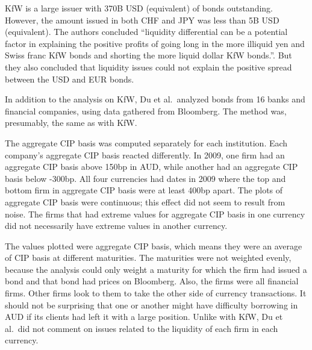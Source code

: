 

KfW is a large issuer with 370B USD (equivalent) of bonds outstanding.  However, the amount issued in both CHF and JPY was less than 5B USD (equivalent).  The authors concluded ``liquidity differential can be a potential factor in explaining the positive profits of going long in the more illiquid yen and Swiss franc KfW bonds and shorting the more liquid dollar KfW bonds.''.  But they also concluded that liquidity issues could not explain the positive spread between the USD and EUR bonds.  


In addition to the analysis on KfW, Du et al.\ analyzed bonds from 16 banks and financial companies, using data gathered from Bloomberg.  The method was, presumably, the same as with KfW.  

The aggregate CIP basis was computed separately for each institution.  Each company's aggregate CIP basis reacted differently.  In 2009, one firm had an aggregate CIP basis above 150bp in AUD, while another had an aggregate CIP basis below -300bp.   All four currencies had dates in 2009 where the top and bottom firm in aggregate CIP basis were at least 400bp apart.  The plots of aggregate CIP basis were continuous; this effect did not seem to result from noise.  The firms that had extreme values for aggregate CIP basis in one currency did not necessarily have extreme values in another currency.  

The values plotted were aggregate CIP basis, which means they were an average of CIP basis at different maturities.  The maturities were not weighted evenly, because the analysis could only weight a maturity for which the firm had issued a bond and that bond had prices on Bloomberg. Also, the firms were all financial firms.  Other firms look to them to take the other side of currency transactions.  It should not be surprising that one or another might have difficulty borrowing in AUD if its clients had left it with a large position.  Unlike with KfW, Du et al.\ did not comment on issues related to the liquidity of each firm in each currency.   


